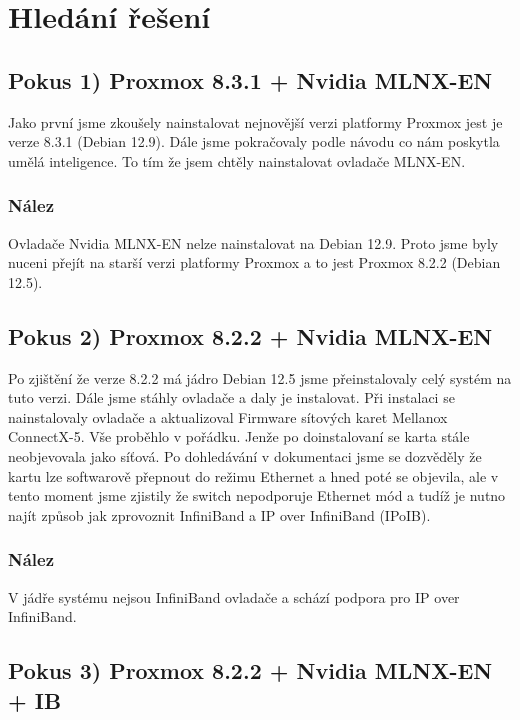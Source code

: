 \newpage

\section{Hledání řešení}

\subsection{Pokus 1) Proxmox 8.3.1 + Nvidia MLNX-EN}
\label{pokus1}
\nepovedeno

Jako první jsme zkoušely nainstalovat nejnovější verzi platformy Proxmox jest je verze 8.3.1 (Debian 12.9). Dále jsme pokračovaly podle návodu co nám poskytla umělá inteligence. To tím že jsem chtěly nainstalovat ovladače MLNX-EN\cite{EN}.

\subsubsection{Nález}
Ovladače Nvidia MLNX-EN\cite{EN} nelze nainstalovat na Debian 12.9. Proto jsme byly nuceni přejít na starší verzi platformy Proxmox a to jest Proxmox 8.2.2 (Debian 12.5).




\subsection{Pokus 2) Proxmox 8.2.2 + Nvidia MLNX-EN}
\label{pokus2}
\nepovedeno

Po zjištění že verze 8.2.2 má jádro Debian 12.5 jsme přeinstalovaly celý systém na tuto verzi. Dále jsme stáhly ovladače a daly je instalovat. Při instalaci se nainstalovaly ovladače a aktualizoval Firmware sítových karet Mellanox ConnectX-5. Vše proběhlo v pořádku. Jenže po doinstalovaní se karta stále neobjevovala jako síťová. Po dohledávání v dokumentaci jsme se  dozvěděly že kartu lze softwarově přepnout do režimu Ethernet a hned poté se objevila, ale v tento moment jsme zjistily že switch nepodporuje Ethernet mód a tudíž je nutno najít způsob jak zprovoznit InfiniBand\cite{InfiniBand} a IP over InfiniBand (IPoIB)\cite{IPoIB}.

\subsubsection{Nález}
V jádře systému nejsou InfiniBand ovladače a schází podpora pro IP over InfiniBand.

\subsection{Pokus 3) Proxmox 8.2.2 + Nvidia MLNX-EN + IB}
\label{pokus3}
\nepovedeno

